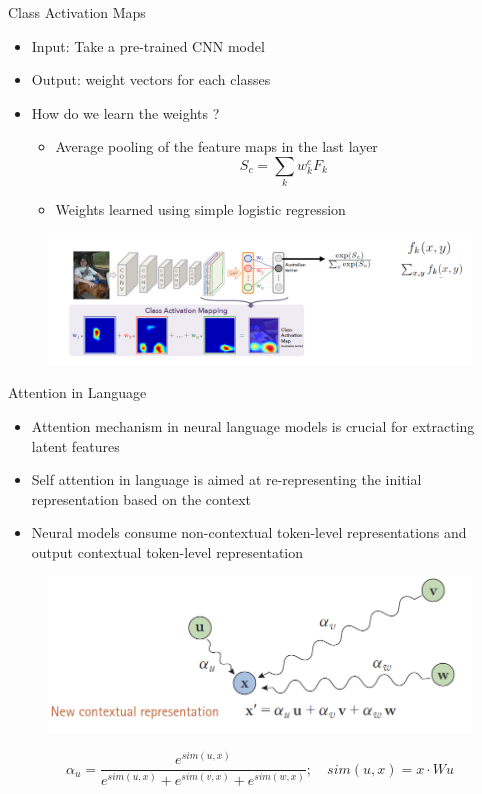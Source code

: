 \documentclass[11pt,compress,t,notes=noshow, aspectratio=169, xcolor=table]{beamer}
\begin{document}
\begin{frame}{Class Activation Maps}
    \begin{itemize}
        \item Input: Take a pre-trained CNN model
        \item Output: weight vectors for each classes
        \item How do we learn the weights ?
        \begin{itemize}
            \item Average pooling of the feature maps in the last layer
            \begin{equation*}
                S_c = \sum\limits_k w_k^c F_k
            \end{equation*}
            \item Weights learned using simple logistic regression
        \end{itemize}
    \end{itemize}
    \begin{figure}
        \centering
        \includegraphics[scale=.35]{bild11}
    \end{figure}
\end{frame}

\begin{frame}{Attention in Language}
    \begin{itemize}
        \item Attention mechanism in neural language models is crucial for extracting latent features
        \item Self attention in language is aimed at re-representing the initial representation based on
the context
\item Neural models consume non-contextual token-level representations and output
contextual token-level representation
    \end{itemize}
    \begin{figure}
        \centering
        \includegraphics[width=0.4\linewidth]{bild12}
    \end{figure}
    \pause
    \begin{equation*}
        \alpha_u  = \frac{e^{sim(u,x)}}{e^{sim(u,x)} + e^{sim(v,x)} + e^{sim(w,x)}}; \quad sim(u,x) = x\cdot Wu
    \end{equation*}
\end{frame}
\end{document}
